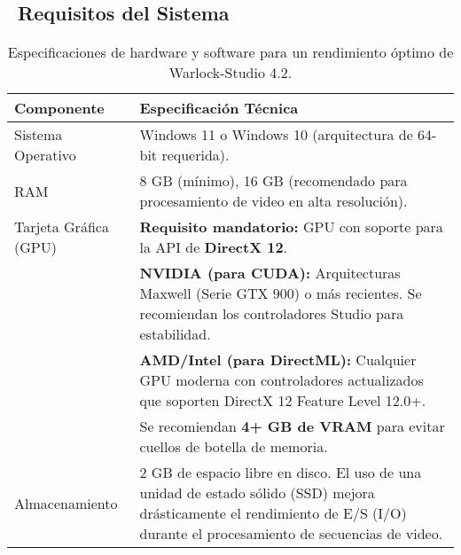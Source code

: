 \documentclass[11pt, a4paper]{article}
\begin{document}
\subsection{\faMicrochip\ Requisitos del Sistema}
\begin{table}[H]
    \centering
    \begin{tabularx}{\textwidth}{lX}
        \toprule
        \textbf{Componente} & \textbf{Especificación Técnica} \\
        \midrule
        Sistema Operativo & Windows 11 o Windows 10 (arquitectura de 64-bit requerida). \\
        RAM & 8 GB (mínimo), 16 GB (recomendado para procesamiento de video en alta resolución). \\
        Tarjeta Gráfica (GPU) & \textbf{Requisito mandatorio:} GPU con soporte para la API de \textbf{DirectX 12}. \\
        & \textbf{NVIDIA (para CUDA):} Arquitecturas Maxwell (Serie GTX 900) o más recientes. Se recomiendan los controladores Studio para estabilidad. \\
        & \textbf{AMD/Intel (para DirectML):} Cualquier GPU moderna con controladores actualizados que soporten DirectX 12 Feature Level 12.0+. \\
        & Se recomiendan \textbf{4+ GB de VRAM} para evitar cuellos de botella de memoria. \\
        Almacenamiento & 2 GB de espacio libre en disco. El uso de una unidad de estado sólido (SSD) mejora drásticamente el rendimiento de E/S (I/O) durante el procesamiento de secuencias de video. \\
        \bottomrule
    \end{tabularx}
    \caption{Especificaciones de hardware y software para un rendimiento óptimo de Warlock-Studio 4.2.}
\end{table}
\end{document}
